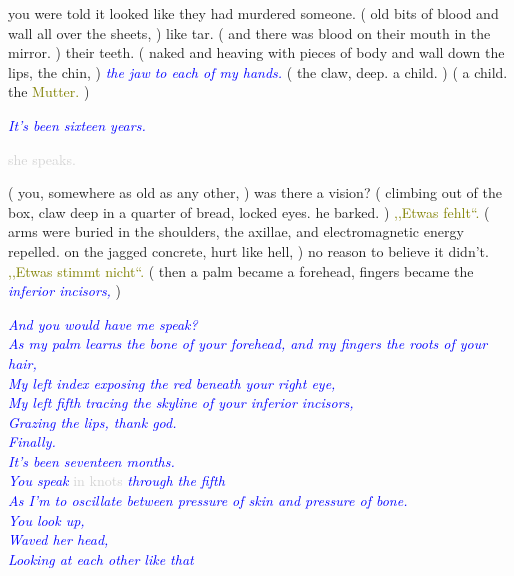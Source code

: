 \documentclass[11pt]{article}
\begin{document}
\begingroup
you were told it looked like they had murdered someone. ( old bits of blood and wall all over the sheets, ) like tar. ( and there was blood on their mouth in the mirror. ) their teeth. ( naked and heaving with pieces of body and wall down the lips, the chin, ) \textit{\textcolor{blue}{the jaw to each of my hands.}} ( the claw, deep.  a child. ) ( a child. the \textcolor{olive}{Mutter.} )
\endgroup

\begingroup
\begin{center}
\textit{\textcolor{blue}{It's been sixteen years.}}
\end{center}
\endgroup

\begingroup
\begin{center}
\textcolor{lightgray}{she speaks.}
\rightskip\leftskip
\end{center}
\endgroup

\begingroup
( you, somewhere as old as any other, ) was there a vision? ( climbing out of the box, claw deep in a quarter of bread, locked eyes. he barked. ) \textcolor{olive}{,,Etwas fehlt“.} ( arms were buried in the shoulders, the axillae, and electromagnetic energy repelled. on the jagged concrete, hurt like hell, ) no reason to believe it didn't. \textcolor{olive}{,,Etwas stimmt nicht“.} ( then a palm became a forehead, fingers became the \textit{\textcolor{blue}{inferior incisors,}} )
\endgroup

\begingroup
\begin{center}
\textit{\textcolor{blue}{And you would have me speak? \\ As my palm learns the bone of your forehead, and my fingers the roots of your hair, \\ My left index exposing the red beneath your right eye, \\ My left fifth tracing the skyline of your inferior incisors, \\ Grazing the lips, thank god. \\ Finally. \\ It's been seventeen months. \\ You speak}} \textcolor{lightgray}{in knots} \textit{\textcolor{blue}{through the fifth \\ As I'm to oscillate between pressure of skin and pressure of bone. \\ You look up, \\ Waved her head, \\ Looking at each other like that } }
\end{center}
\endgroup
\end{document}
